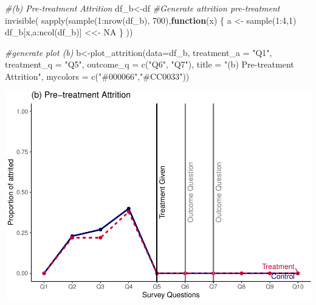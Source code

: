 \documentclass[
]{article}
\newenvironment{Shaded}{\begin{snugshade}}{\end{snugshade}}
\newcommand{\AttributeTok}[1]{\textcolor[rgb]{0.77,0.63,0.00}{#1}}
\newcommand{\CommentTok}[1]{\textcolor[rgb]{0.56,0.35,0.01}{\textit{#1}}}
\newcommand{\ConstantTok}[1]{\textcolor[rgb]{0.00,0.00,0.00}{#1}}
\newcommand{\ControlFlowTok}[1]{\textcolor[rgb]{0.13,0.29,0.53}{\textbf{#1}}}
\newcommand{\DecValTok}[1]{\textcolor[rgb]{0.00,0.00,0.81}{#1}}
\newcommand{\FunctionTok}[1]{\textcolor[rgb]{0.00,0.00,0.00}{#1}}
\newcommand{\NormalTok}[1]{#1}
\newcommand{\OtherTok}[1]{\textcolor[rgb]{0.56,0.35,0.01}{#1}}
\newcommand{\SpecialCharTok}[1]{\textcolor[rgb]{0.00,0.00,0.00}{#1}}
\newcommand{\StringTok}[1]{\textcolor[rgb]{0.31,0.60,0.02}{#1}}
\begin{document}
\begin{Shaded}
\begin{Highlighting}[]
\CommentTok{\#(b) Pre{-}treatment Attrition}
\NormalTok{df\_b}\OtherTok{\textless{}{-}}\NormalTok{df}
\CommentTok{\#Generate attrition pre{-}treatment}
\FunctionTok{invisible}\NormalTok{(}
\FunctionTok{sapply}\NormalTok{(}\FunctionTok{sample}\NormalTok{(}\DecValTok{1}\SpecialCharTok{:}\FunctionTok{nrow}\NormalTok{(df\_b), }\DecValTok{700}\NormalTok{),}\ControlFlowTok{function}\NormalTok{(x) \{}
\NormalTok{    a }\OtherTok{\textless{}{-}} \FunctionTok{sample}\NormalTok{(}\DecValTok{1}\SpecialCharTok{:}\DecValTok{4}\NormalTok{,}\DecValTok{1}\NormalTok{)}
\NormalTok{    df\_b[x,a}\SpecialCharTok{:}\FunctionTok{ncol}\NormalTok{(df\_b)] }\OtherTok{\textless{}\textless{}{-}} \ConstantTok{NA}
\NormalTok{\}}
\NormalTok{))}


\CommentTok{\#generate plot (b)}
\NormalTok{b}\OtherTok{\textless{}{-}}\FunctionTok{plot\_attrition}\NormalTok{(}\AttributeTok{data=}\NormalTok{df\_b,}
              \AttributeTok{treatment\_a =} \StringTok{"Q1"}\NormalTok{,}
              \AttributeTok{treatment\_q =} \StringTok{"Q5"}\NormalTok{,}
              \AttributeTok{outcome\_q =}  \FunctionTok{c}\NormalTok{(}\StringTok{"Q6"}\NormalTok{, }\StringTok{"Q7"}\NormalTok{),}
              \AttributeTok{title =} \StringTok{"(b) Pre{-}treatment Attrition"}\NormalTok{,}
              \AttributeTok{mycolors =} \FunctionTok{c}\NormalTok{(}\StringTok{"\#000066"}\NormalTok{,}\StringTok{"\#CC0033"}\NormalTok{))}
\end{Highlighting}
\end{Shaded}

\includegraphics{paper_replication_files/figure-latex/timeline-2.pdf}
\end{document}
